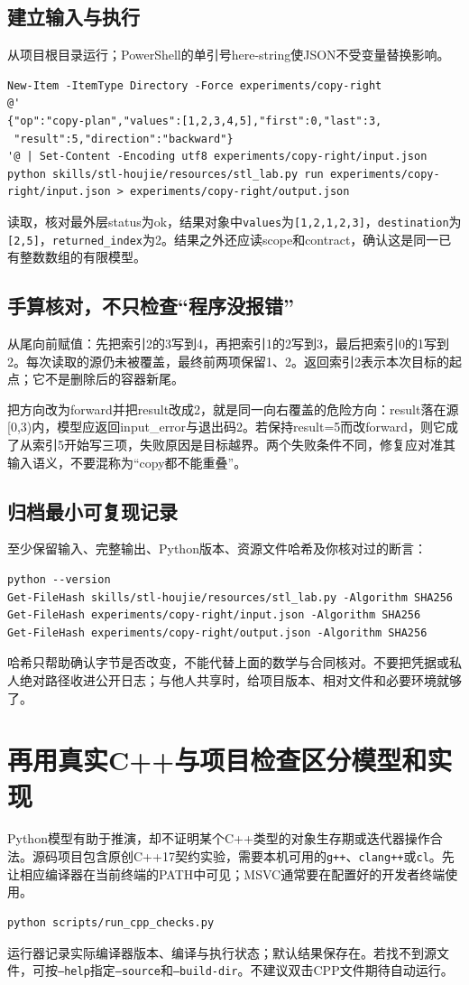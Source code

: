 \documentclass[11pt,a4paper,fontset=fandol]{ctexart}
\begin{document}
\subsection{建立输入与执行}
从项目根目录运行；PowerShell的单引号here-string使JSON不受变量替换影响。
\begin{lstlisting}
New-Item -ItemType Directory -Force experiments/copy-right
@'
{"op":"copy-plan","values":[1,2,3,4,5],"first":0,"last":3,
 "result":5,"direction":"backward"}
'@ | Set-Content -Encoding utf8 experiments/copy-right/input.json
python skills/stl-houjie/resources/stl_lab.py run experiments/copy-right/input.json > experiments/copy-right/output.json
\end{lstlisting}
读取，核对最外层status为ok，结果对象中\texttt{values}为\texttt{[1,2,1,2,3]}，\texttt{destination}为\texttt{[2,5]}，\texttt{returned\_index}为2。结果之外还应读scope和contract，确认这是同一已有整数数组的有限模型。

\subsection{手算核对，不只检查“程序没报错”}
从尾向前赋值：先把索引2的3写到4，再把索引1的2写到3，最后把索引0的1写到2。每次读取的源仍未被覆盖，最终前两项保留1、2。返回索引2表示本次目标的起点；它不是删除后的容器新尾。

把方向改为forward并把result改成2，就是同一向右覆盖的危险方向：result落在源[0,3)内，模型应返回input\_error与退出码2。若保持result=5而改forward，则它成了从索引5开始写三项，失败原因是目标越界。两个失败条件不同，修复应对准其输入语义，不要混称为“copy都不能重叠”。

\subsection{归档最小可复现记录}
至少保留输入、完整输出、Python版本、资源文件哈希及你核对过的断言：
\begin{lstlisting}
python --version
Get-FileHash skills/stl-houjie/resources/stl_lab.py -Algorithm SHA256
Get-FileHash experiments/copy-right/input.json -Algorithm SHA256
Get-FileHash experiments/copy-right/output.json -Algorithm SHA256
\end{lstlisting}
哈希只帮助确认字节是否改变，不能代替上面的数学与合同核对。不要把凭据或私人绝对路径收进公开日志；与他人共享时，给项目版本、相对文件和必要环境就够了。
\section{再用真实C++与项目检查区分模型和实现}
Python模型有助于推演，却不证明某个C++类型的对象生存期或迭代器操作合法。源码项目包含原创C++17契约实验，需要本机可用的\texttt{g++}、\texttt{clang++}或\texttt{cl}。先让相应编译器在当前终端的PATH中可见；MSVC通常要在配置好的开发者终端使用。
\begin{lstlisting}
python scripts/run_cpp_checks.py
\end{lstlisting}
运行器记录实际编译器版本、编译与执行状态；默认结果保存在。若找不到源文件，可按\texttt{--help}指定\texttt{--source}和\texttt{--build-dir}。不建议双击CPP文件期待自动运行。
\end{document}
